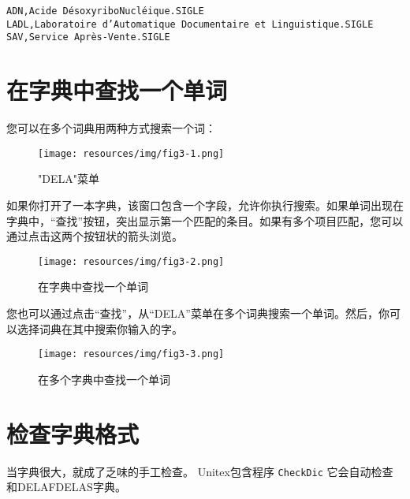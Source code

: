\bigskip
\begin{verbatim}
ADN,Acide DésoxyriboNucléique.SIGLE
LADL,Laboratoire d’Automatique Documentaire et Linguistique.SIGLE
SAV,Service Après-Vente.SIGLE
\end{verbatim}



\section{在字典中查找一个单词}
\label{section-dictionary-lookup}
您可以在多个词典用两种方式搜索一个词：

\begin{figure}[h!]
\begin{center}
\texttt{[image: resources/img/fig3-1.png]}
\caption{"DELA"菜单}
\end{center}
\end{figure}

\bigskip
\noindent
如果你打开了一本字典，该窗口包含一个字段，允许你执行搜索。如果单词出现在字典中，“查找”按钮，突出显示第一个匹配的条目。如果有多个项目匹配，您可以通过点击这两个按钮状的箭头浏览。
\begin{figure}[h!]
\begin{center}
\texttt{[image: resources/img/fig3-2.png]}
\caption{在字典中查找一个单词}
\end{center}
\end{figure}

\bigskip
\noindent
您也可以通过点击“查找”，从“DELA”菜单在多个词典搜索一个单词。然后，你可以选择词典在其中搜索你输入的字。

\begin{figure}[h!]
\begin{center}
\texttt{[image: resources/img/fig3-3.png]}
\caption{在多个字典中查找一个单词}
\end{center}
\end{figure}

\bigskip
\noindent





\section{检查字典格式}
 
当字典很大，就成了乏味的手工检查。 Unitex包含程序 \verb+CheckDic+
 它会自动检查和DELAFDELAS字典。

